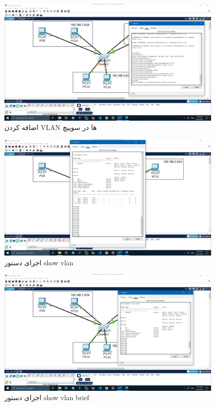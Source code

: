 \documentclass[12pt]{article}
\begin{document}
	\begin{figure}[H]
		\centering
		\includegraphics[width=\textwidth]{resources/14.png}
		\caption{اضافه کردن \textenglish{VLAN} ها در سوییچ}
		\label{img:14}
	\end{figure}
	\begin{figure}[H]
		\centering
		\includegraphics[width=\textwidth]{resources/15.png}
		\caption{اجرای دستور \textenglish{show vlan}}
		\label{img:15}
	\end{figure}
	\begin{figure}[H]
		\centering
		\includegraphics[width=\textwidth]{resources/16.png}
		\caption{اجرای دستور \textenglish{show vlan brief}}
		\label{img:16}
	\end{figure}
\end{document}
